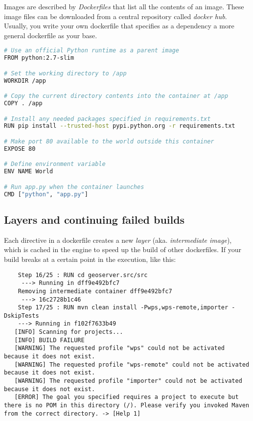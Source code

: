 Images are described by \emph{Dockerfiles} that list all the contents of an image. These image files can be downloaded from a central repository called \emph{docker hub}.
Usually, you write your own dockerfile that specifies as a dependency a more general dockerfile as your base. 

\begin{lstlisting}[language=bash]
# Use an official Python runtime as a parent image
FROM python:2.7-slim

# Set the working directory to /app
WORKDIR /app

# Copy the current directory contents into the container at /app
COPY . /app

# Install any needed packages specified in requirements.txt
RUN pip install --trusted-host pypi.python.org -r requirements.txt

# Make port 80 available to the world outside this container
EXPOSE 80

# Define environment variable
ENV NAME World

# Run app.py when the container launches
CMD ["python", "app.py"]
\end{lstlisting}




\subsection{Layers and continuing failed builds}

Each directive in a dockerfile creates a new \emph{layer} (aka. \emph{intermediate image}), which is cached in the engine to speed up the build of other dockerfiles. 
If your build breaks at a certain point in the execution, like this: 

\begin{lstlisting}
    Step 16/25 : RUN cd geoserver.src/src
     ---> Running in dff9e492bfc7
    Removing intermediate container dff9e492bfc7
     ---> 16c2728b1c46
    Step 17/25 : RUN mvn clean install -Pwps,wps-remote,importer -DskipTests
    ---> Running in f102f7633b49
   [INFO] Scanning for projects...
   [INFO] BUILD FAILURE
   [WARNING] The requested profile "wps" could not be activated because it does not exist.
   [WARNING] The requested profile "wps-remote" could not be activated because it does not exist.
   [WARNING] The requested profile "importer" could not be activated because it does not exist.
   [ERROR] The goal you specified requires a project to execute but there is no POM in this directory (/). Please verify you invoked Maven from the correct directory. -> [Help 1]
\end{lstlisting}

